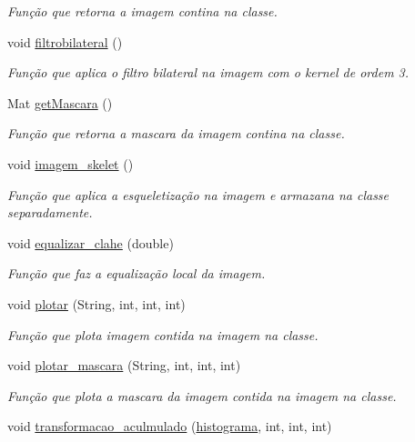 \begin{DoxyCompactItemize}
\begin{DoxyCompactList}\small\item\em Função que retorna a imagem contina na classe. \end{DoxyCompactList}\item 
void \mbox{\hyperlink{classimagem_ac17d8fd15a1929bab5db225542dd71a6}{filtrobilateral}} ()
\begin{DoxyCompactList}\small\item\em Função que aplica o filtro bilateral na imagem com o kernel de ordem 3. \end{DoxyCompactList}\item 
Mat \mbox{\hyperlink{classimagem_a0acb8bdd2e3305c22fe0f859c7bb7bb4}{get\+Mascara}} ()
\begin{DoxyCompactList}\small\item\em Função que retorna a mascara da imagem contina na classe. \end{DoxyCompactList}\item 
void \mbox{\hyperlink{classimagem_af4ba91ae6fe7753c8b28b8da5580f957}{imagem\+\_\+skelet}} ()
\begin{DoxyCompactList}\small\item\em Função que aplica a esqueletização na imagem e armazana na classe separadamente. \end{DoxyCompactList}\item 
void \mbox{\hyperlink{classimagem_a1b1f0b60fedab7a7551a01d566318c8c}{equalizar\+\_\+clahe}} (double)
\begin{DoxyCompactList}\small\item\em Função que faz a equalização local da imagem. \end{DoxyCompactList}\item 
void \mbox{\hyperlink{classimagem_a9dc03632a97e3511e8df39b643945374}{plotar}} (String, int, int, int)
\begin{DoxyCompactList}\small\item\em Função que plota imagem contida na imagem na classe. \end{DoxyCompactList}\item 
void \mbox{\hyperlink{classimagem_a02367972deb183901af1fa24a0f746e9}{plotar\+\_\+mascara}} (String, int, int, int)
\begin{DoxyCompactList}\small\item\em Função que plota a mascara da imagem contida na imagem na classe. \end{DoxyCompactList}\item 
void \mbox{\hyperlink{classimagem_aafd1bd7c1570477c12ddbd76d14c68c9}{transformacao\+\_\+aculmulado}} (\mbox{\hyperlink{classhistograma}{histograma}}, int, int, int)

\end{DoxyCompactItemize}

